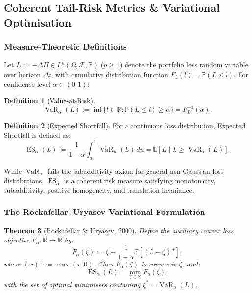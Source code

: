 \documentclass{article}
\theoremstyle{plain}
\newtheorem{theorem}{Theorem}[section]
\theoremstyle{definition}
\newtheorem{definition}[theorem]{Definition}
\theoremstyle{remark}
\begin{document}
\subsection{Coherent Tail-Risk Metrics \& Variational Optimisation}

\subsubsection{Measure-Theoretic Definitions}
Let $L := -\Delta \Pi \in L^p(\Omega, \mathcal{F}, \mathbb{P})$ ($p \ge 1$) denote the portfolio loss random variable over horizon $\Delta t$, with cumulative distribution function $F_L(l) = \mathbb{P}(L \le l)$. For confidence level $\alpha \in (0, 1)$:

\begin{definition}[Value-at-Risk]
\begin{equation}
\operatorname{VaR}_\alpha(L) := \inf\{l \in \mathbb{R} : \mathbb{P}(L \le l) \ge \alpha\} = F_L^{-1}(\alpha).
\end{equation}
\end{definition}

\begin{definition}[Expected Shortfall]
For a continuous loss distribution, Expected Shortfall is defined as:
\begin{equation}
\operatorname{ES}_\alpha(L) := \frac{1}{1 - \alpha}\int_\alpha^1 \operatorname{VaR}_u(L)\,du = \mathbb{E}\left[L \mid L \ge \operatorname{VaR}_\alpha(L)\right].
\end{equation}
\end{definition}
While $\operatorname{VaR}_\alpha$ fails the subadditivity axiom for general non-Gaussian loss distributions, $\operatorname{ES}_\alpha$ is a coherent risk measure satisfying monotonicity, subadditivity, positive homogeneity, and translation invariance.

\subsubsection{The Rockafellar--Uryasev Variational Formulation}
\begin{theorem}[Rockafellar \& Uryasev, 2000]
Define the auxiliary convex loss objective $F_\alpha: \mathbb{R} \to \mathbb{R}$ by:
\begin{equation}
F_\alpha(\zeta) := \zeta + \frac{1}{1 - \alpha}\mathbb{E}\left[(L - \zeta)^+\right],
\end{equation}
where $(x)^+ := \max(x, 0)$. Then $F_\alpha(\zeta)$ is convex in $\zeta$, and:
\begin{equation}
\operatorname{ES}_\alpha(L) = \min_{\zeta \in \mathbb{R}} F_\alpha(\zeta),
\end{equation}
with the set of optimal minimisers containing $\zeta^* = \operatorname{VaR}_\alpha(L)$.
\end{theorem}
\end{document}
